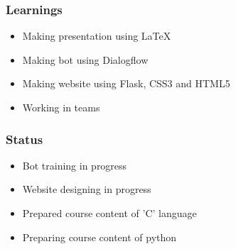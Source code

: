 \documentclass[14pt]{beamer}
\begin{document}
\begin{frame}
    \frametitle{Learnings}
    \begin{itemize}
    \item Making presentation using LaTeX \\
    \item Making bot using Dialogflow \\
    \item Making website using Flask, CSS3 and HTML5 \\
    \item Working in teams\\
\end{itemize}
\end{frame}

\begin{frame}
    \frametitle{Status}
    \begin{itemize}
    \item Bot training in progress \\
    \item Website designing in progress \\
    \item Prepared course content of 'C' language \\  
    \item Preparing course content of python \\
\end{itemize}
\end{frame}
    
\end{document}
